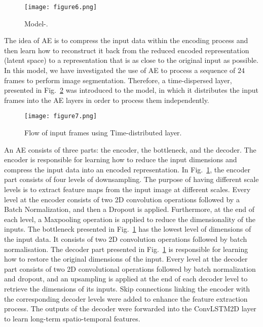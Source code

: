 \begin{sloppypar}
	\begin{figure} [ht!]
			\centering
			\texttt{[image: figure6.png]}
			\caption{Model-.} %
			\label{fig:AE_convlstm}
	\end{figure} 
	
	The idea of AE is to compress the input data within the encoding process and then learn how to reconstruct it back from the reduced encoded representation (latent space) to a representation that is as close to the original input as possible. 
	In this model, we have investigated the use of AE to process a sequence of \(24\) frames to perform image segmentation.
	Therefore, a time-dispersed layer, presented in Fig.~\ref{fig:TD} was introduced to the model, in which it distributes the input frames into the AE layers in order to process them independently.
	\begin{figure}[!ht]
		\centering
		\texttt{[image: figure7.png]}
		\caption{Flow of input frames using Time-distributed layer.}
		\label{fig:TD}
	\end{figure}
	
	An AE consists of three parts: the encoder, the bottleneck, and the decoder.
	The encoder is responsible for learning how to reduce the input dimensions and compress the input data into an encoded representation.
	In Fig.~\ref{fig:AE_convlstm}, the encoder part consists of four levels of downsampling. 
	The purpose of having different scale levels is to extract feature maps from the input image at different scales.
	Every level at the encoder consists of two 2D convolution operations followed by a Batch Normalization, and then a Dropout is applied.
	Furthermore, at the end of each level, a Maxpooling operation is applied to reduce the dimensionality of the inputs. 
	The bottleneck presented in Fig.~\ref{fig:AE_convlstm} has the lowest level of dimensions of the input data.
	It consists of two 2D convolution operations followed by batch normalisation.
	The decoder part presented in Fig.~\ref{fig:AE_convlstm} is responsible for learning how to restore the original dimensions of the input.
	Every level at the decoder part consists of two 2D convolutional operations followed by batch normalization and dropout, and an upsampling is applied at the end of each decoder level to retrieve the dimensions of its inputs.
	Skip connections linking the encoder with the corresponding decoder levels were added to enhance the feature extraction process.
	The outputs of the decoder were forwarded into the ConvLSTM2D layer to learn long-term spatio-temporal features.
	

\end{sloppypar}

